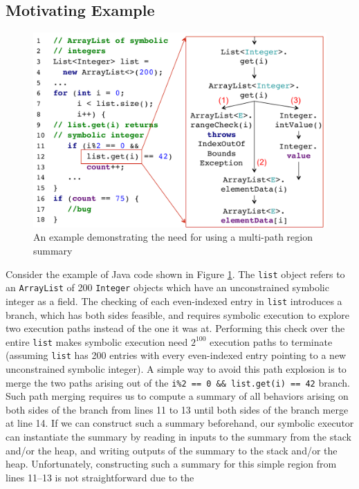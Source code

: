 \subsection{Motivating Example}
\begin{figure}
    \includegraphics[width=\textwidth]{figures/example-combined.pdf}
    \caption{An example demonstrating the need for using a multi-path region summary}
    \label{fig:mot-example}
\end{figure}
Consider the example of Java code shown in Figure \ref{fig:mot-example}.
%
The {\tt list} object refers to an {\tt ArrayList} of 200 {\tt Integer} objects which have an unconstrained symbolic
integer as a field.
%
The checking of each even-indexed entry in {\tt list} introduces a branch, which has both sides feasible, and requires
symbolic execution to explore two execution paths instead of the one it was at.
%
Performing this check over the entire {\tt list} makes symbolic execution need $2^{100}$ execution paths to terminate
(assuming {\tt list} has 200 entries with every even-indexed entry pointing to a new unconstrained symbolic integer).
%
A simple way to avoid this path explosion is to merge the two paths arising out of the {\tt i\%2 == 0 \&\& list.get(i) == 42} branch.
%
Such path merging requires us to compute a summary of all behaviors arising on both sides of the branch from lines 11 to 13
until both sides of the branch merge at line 14.
%
If we can construct such a summary beforehand, our symbolic executor can instantiate the summary by reading in inputs to
the summary from the stack and/or the heap, and writing outputs of the summary to the stack and/or the heap.
%
Unfortunately, constructing such a summary for this simple region from lines 11--13 is not straightforward due to the
